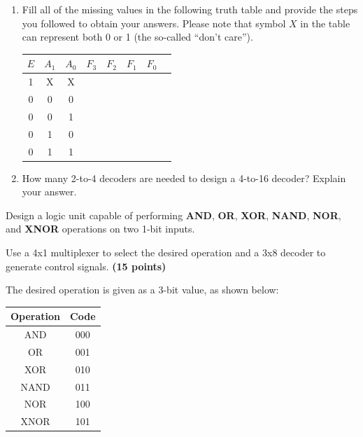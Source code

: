 \documentclass[10pt,answers]{exam}
\newcommand{\qpoints}[1]{\hfill \textbf{(#1 points)}}
\begin{document}
\begin{questions}
\begin{enumerate}[label=\alph*)]
    \item Fill all of the missing values in the following truth table and provide the steps you followed to obtain your answers. Please note that symbol $X$ in the table can represent both 0 or 1 (the so-called “don’t care”).

    \begin{center}
        \begin{tabular}{|c|c|c|c|c|c|c|c|}
        \hline
        $E$ & $A_1$ & $A_0$ & $F_3$ & $F_2$ & $F_1$ & $F_0$ \\ \hline
        1   & X     & X     &       &       &       &       \\ \hline
        0   & 0     & 0     &       &       &       &       \\ \hline
        0   & 0     & 1     &       &       &       &       \\ \hline
        0   & 1     & 0     &       &       &       &       \\ \hline
        0   & 1     & 1     &       &       &       &       \\ \hline
        \end{tabular}
    \end{center}

    \item How many 2-to-4 decoders are needed to design a 4-to-16 decoder? Explain your answer.
\end{enumerate}

\begin{solution}
    
\end{solution}



\question Design a logic unit capable of performing \textbf{AND}, \textbf{OR}, \textbf{XOR}, \textbf{NAND}, \textbf{NOR}, and \textbf{XNOR} operations on two 1-bit inputs. 

Use a 4x1 multiplexer to select the desired operation and a 3x8 decoder to generate control signals. \qpoints{15}

The desired operation is given as a 3-bit value, as shown below:

\begin{center}
    \begin{tabular}{|c|c|}
        \hline
        \textbf{Operation} & \textbf{Code} \\ \hline
        AND & 000 \\ \hline
        OR & 001 \\ \hline
        XOR & 010 \\ \hline
        NAND & 011 \\ \hline
        NOR & 100 \\ \hline
        XNOR & 101 \\ \hline
    \end{tabular}
\end{center}

\begin{solution}
    
\end{solution}


\end{questions}
\end{document}
